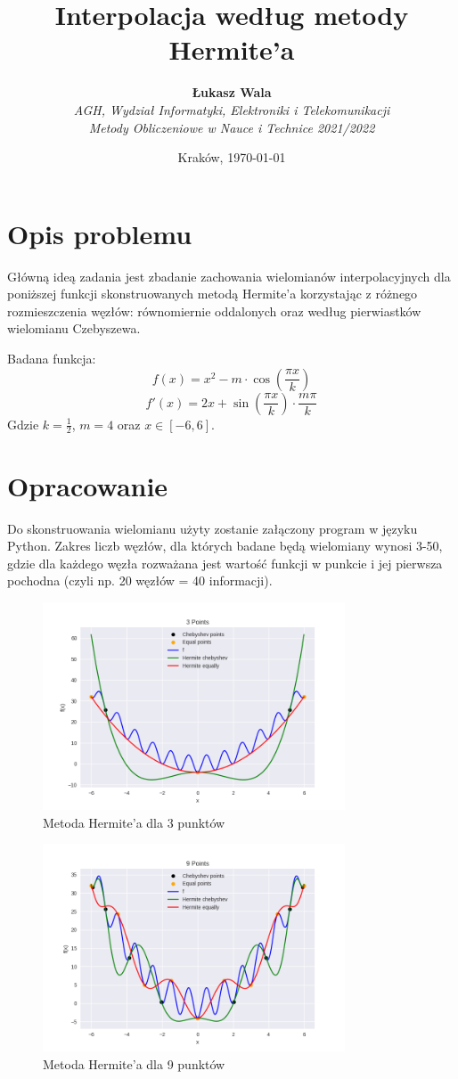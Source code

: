 \documentclass{article}
\title{Interpolacja według metody Hermite'a}
\author{\textbf{Łukasz Wala}\\
    \textit{AGH, Wydział Informatyki, Elektroniki i Telekomunikacji} \\
    \textit{Metody Obliczeniowe w Nauce i Technice 2021/2022}}
\date{Kraków, \today}
\begin{document}
\maketitle

\section{Opis problemu}
Główną ideą zadania jest zbadanie zachowania wielomianów interpolacyjnych
dla poniższej funkcji skonstruowanych metodą Hermite'a korzystając z różnego 
rozmieszczenia węzłów: równomiernie oddalonych oraz według pierwiastków wielomianu
Czebyszewa.

Badana funkcja:
\[f(x)=x^2-m\cdot\cos\left(\frac{\pi x}{k}\right)\]
\[f'(x) = 2x+\sin(\frac{\pi x}{k})\cdot\frac{m\pi}{k}\]
Gdzie $k=\frac{1}{2}$, $m=4$ oraz $x\in [-6,6]$.


\section{Opracowanie}
Do skonstruowania wielomianu użyty zostanie załączony program w języku Python. Zakres liczb węzłów, dla których
badane będą wielomiany wynosi 3-50, gdzie dla każdego węzła rozważana jest wartość funkcji w punkcie i jej pierwsza pochodna
(czyli np. 20 węzłów = 40 informacji).

\begin{figure}[H]
    \centering
    \includegraphics[width=0.8\textwidth]{img/herm_3.png}
    \caption{Metoda Hermite'a dla 3 punktów}
\end{figure}

\begin{figure}[H]
    \centering
    \includegraphics[width=0.8\textwidth]{img/herm_9.png}
    \caption{Metoda Hermite'a dla 9 punktów}
\end{figure}
\end{document}

